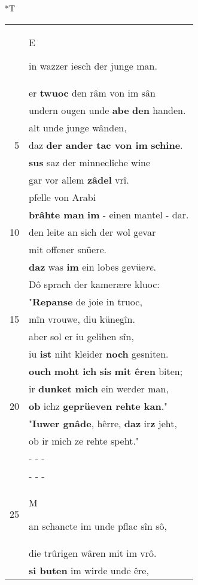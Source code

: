 \documentclass[8pt,a4paper,notitlepage]{article}
\begin{document}
\begin{table}[ht]
\begin{minipage}[t]{0.5\linewidth}
\small
\begin{center}*T
\end{center}
\begin{tabular}{rl}
 & \begin{large}E\end{large}in wazzer iesch der junge man.\\ 
 & er \textbf{twuoc} den râm von im sân\\ 
 & undern ougen unde \textbf{abe} \textbf{den} handen.\\ 
 & alt unde junge wânden,\\ 
5 & daz \textbf{der ander tac von im} \textbf{schine}.\\ 
 & \textbf{sus} saz der minneclîche wine\\ 
 & gar vor allem \textbf{zâdel} vrî.\\ 
 & pfelle von Arabi\\ 
 & \textbf{brâhte man} \textbf{im} - einen mantel - dar.\\ 
10 & den leite an sich der wol gevar\\ 
 & mit offener snüere.\\ 
 & \textbf{daz} was \textbf{im} ein lobes gevüe\textit{re}.\\ 
 & Dô sprach der kamerære kluoc:\\ 
 & "\textbf{Repanse} de joie in truoc,\\ 
15 & mîn vrouwe, diu künegîn.\\ 
 & aber sol er iu gelihen sîn,\\ 
 & iu \textbf{ist} niht kleider \textbf{noch} gesniten.\\ 
 & \textbf{ouch} \textbf{moht ich} \textbf{si}\textbf{s} \textbf{mit êren} biten;\\ 
 & ir \textbf{dunket mich} ein werder man,\\ 
20 & \textbf{ob} ichz \textbf{geprüeven rehte kan}."\\ 
 & "\textbf{Iuwer gnâde}, hêrre, \textbf{daz} ir\textbf{z} jeht,\\ 
 & ob ir mich ze rehte speht."\\ 
 & \multicolumn{1}{l}{ - - - }\\ 
 & \multicolumn{1}{l}{ - - - }\\ 
25 & \begin{large}M\end{large}an schancte im unde pflac sîn sô,\\ 
 & die trûrigen wâren mit im vrô.\\ 
 & \textbf{si buten} im wirde unde êre,\\ 

\end{tabular}
\end{minipage}
\end{table}
\end{document}

